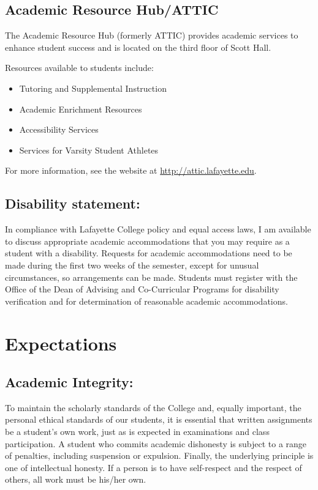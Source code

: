 \documentclass[12pt]{amsart}
\begin{document}
\subsection*{Academic Resource Hub/ATTIC}
\noindent
The Academic Resource Hub (formerly ATTIC) provides academic services to enhance student success and is located on the third floor of Scott Hall.

Resources available to students include:
\begin{itemize}
\item 
  Tutoring and Supplemental Instruction
\item
  Academic Enrichment Resources
\item
  Accessibility Services
\item
  Services for Varsity Student Athletes
\end{itemize}
For more information, see the website at \url{http://attic.lafayette.edu}.

\subsection*{Disability statement:}
In compliance with Lafayette College policy and equal access laws, I am available to discuss appropriate academic accommodations that you may require as a student with a disability.  Requests for academic accommodations need to be made during the first two weeks of the semester, except for unusual circumstances, so arrangements can be made.  Students must register with the Office of the Dean of Advising and Co-Curricular Programs for disability verification and for determination of reasonable academic accommodations.


\section*{Expectations}
\noindent
\subsection*{Academic Integrity:}
To maintain the scholarly standards of the College and, equally important, the personal ethical standards of our students, it is essential that written assignments be a student’s own work, just as is expected in examinations and class participation. A student who commits academic dishonesty is subject to a range of penalties, including suspension or expulsion. Finally, the underlying principle is one of intellectual honesty. If a person is to have self-respect and the respect of others, all work must be his/her own.
\end{document}

